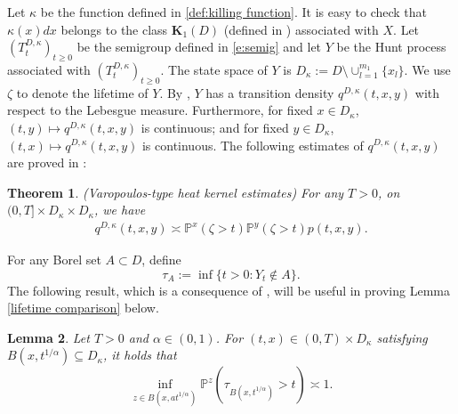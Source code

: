 \documentclass[12pt,a4paper]{amsart}
\numberwithin{equation}{section}
\theoremstyle{plain}
\newcommand{\mb}{\mathbb}
\newcommand{\1}{\mathbbm{1}}
\newtheorem{theorem}{Theorem}[section]
\newtheorem{lemma}[theorem]{Lemma}
\begin{document}
Let $\kappa$ be the function defined in \eqref{def:killing function}. It is easy to check that $\kappa(x)dx$ belongs to
the class $\mathbf{K}_1(D)$ (defined in \cite[Definition 2.12]{CKSV20})  associated with $X$. Let $(T^{D, \kappa}_t)_{t\ge 0}$
be the semigroup defined in \eqref{e:semig} and let $Y$ be the Hunt process associated with $(T^{D, \kappa}_t)_{t\ge 0}$.
The state space of $Y$ is $D_{\kappa}:=D\setminus \cup^{m_1}_{l=1}\{x_l\}$. We use $\zeta$ to denote the lifetime of $Y$. 
By \cite[Proposition 2.14 and the argument before it]{CKSV20}, $Y$ 
has a transition density $q^{D, \kappa}(t,x,y)$ with respect to the Lebesgue measure.
Furthermore,  for fixed $x\in D_\kappa$, 
$(t,y)\mapsto q^{D, \kappa}(t,x,y)$ is continuous; 
and for fixed $y\in D_\kappa$, 
$(t,x)\mapsto q^{D, \kappa}(t,x,y)$ is continuous. The following estimates of $q^{D, \kappa}(t, x, y)$ are proved in \cite[Theorem 2.22]{CKSV20}:

\begin{theorem}\label{t:vthke}
(Varopoulos-type heat kernel estimates)
For any $T>0$,  
on $(0, T]\times D_\kappa\times D_\kappa$, we have 
\begin{align*}
q^{D, \kappa}(t,x,y) \asymp \mb{P}^x(\zeta > t)\mb{P}^y(\zeta > t)p(t,x,y).
\end{align*}
\end{theorem}

For any Borel set $A\subset D$, define
\begin{equation*}
\tau_A:= \inf \{t>0:Y_t \notin A\}.
\end{equation*}
The following result, which is a consequence of \cite[Corollary 2.16]{CKSV20},   will be useful in proving Lemma \ref{lifetime comparison} below.
\begin{lemma}\label{lemma:interior}
Let $T>0$ and $\alpha\in (0,1)$.  
For $(t, x)\in (0, T)\times D_\kappa$ satisfying 
$B(x,t^{1/\alpha}) \subseteq D_\kappa$, it holds that
$$
\inf_{z \in B(x,at^{1/\alpha})}\mb{P}^z(\tau_{B(x,t^{1/\alpha})} > t) \asymp 1.
$$ 
\end{lemma}
\end{document}
